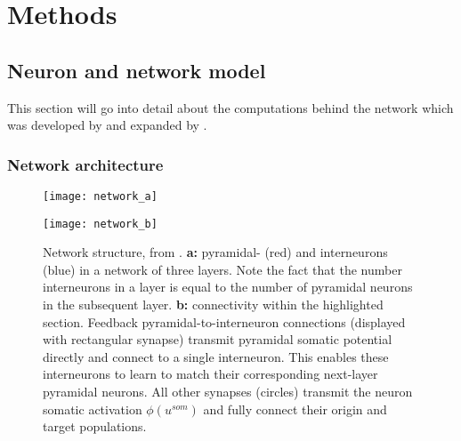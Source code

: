 
\chapter{Methods}




\section{Neuron and network model}

This section will go into detail about the computations behind the network which was developed by
\cite{sacramento2018dendritic} and expanded by \cite{Haider2021}.


\subsection{Network architecture}

\begin{figure}
  \centering
  \begin{minipage}{0.5\textwidth}
    \centering
    \texttt{[image: network\_a]}
  \end{minipage}\hfill
  \begin{minipage}{0.4\textwidth}
    \centering
    \texttt{[image: network\_b]}
  \end{minipage}
  \caption{Network structure, from \cite{Haider2021}. \textbf{a:} pyramidal- (red) and interneurons (blue) in a network
    of three layers. Note the fact that the number interneurons in a layer is equal to the number of pyramidal neurons
    in the subsequent layer\protect\footnotemark. \textbf{b:} connectivity within the highlighted section. Feedback
    pyramidal-to-interneuron connections (displayed with rectangular synapse) transmit pyramidal somatic potential
    directly and connect to a single interneuron. This enables these interneurons to learn to match their corresponding
    next-layer pyramidal neurons. All other synapses (circles) transmit the neuron somatic activation $\phi (u^{som})$
    and fully connect their origin and target populations.}
  \label{fig-network}
\end{figure}



